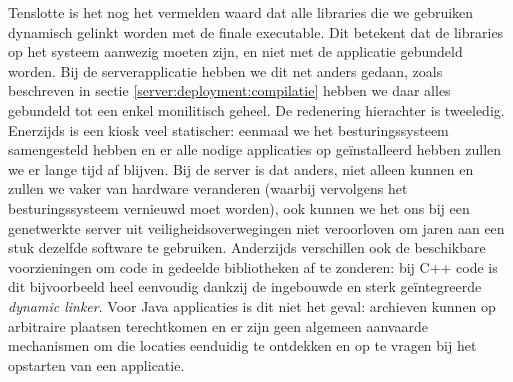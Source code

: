 Tenslotte is het nog het vermelden waard dat alle libraries die we gebruiken dynamisch gelinkt worden met de finale executable. Dit betekent dat de libraries op het systeem aanwezig moeten zijn, en niet met de applicatie gebundeld worden. Bij de serverapplicatie hebben we dit net anders gedaan, zoals beschreven in sectie \ref{server:deployment:compilatie} hebben we daar alles gebundeld tot een enkel monilitisch geheel. De redenering hierachter is tweeledig. Enerzijds is een kiosk veel statischer: eenmaal we het besturingssysteem samengesteld hebben en er alle nodige applicaties op geïnstalleerd hebben zullen we er lange tijd af blijven. Bij de server is dat anders, niet alleen kunnen en zullen we vaker van hardware veranderen (waarbij vervolgens het besturingssysteem vernieuwd moet worden), ook kunnen we het ons bij een genetwerkte server uit veiligheidsoverwegingen niet veroorloven om jaren aan een stuk dezelfde software te gebruiken. Anderzijds verschillen ook de beschikbare voorzieningen om code in gedeelde bibliotheken af te zonderen: bij C++ code is dit bijvoorbeeld heel eenvoudig dankzij de ingebouwde en sterk geïntegreerde \emph{dynamic linker}. Voor Java applicaties is dit niet het geval: archieven kunnen op arbitraire plaatsen terechtkomen en er zijn geen algemeen aanvaarde mechanismen om die locaties eenduidig te ontdekken en op te vragen bij het opstarten van een applicatie.
